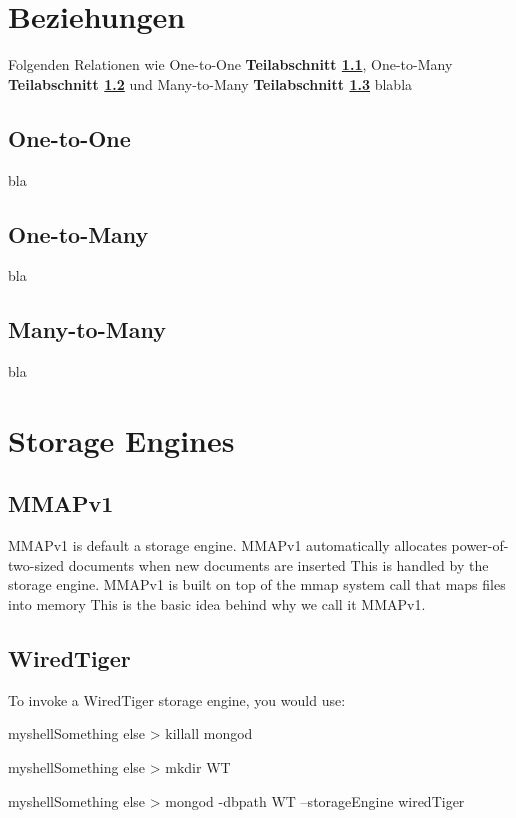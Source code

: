 \section{Beziehungen}
Folgenden Relationen wie One-to-One \textbf{Teilabschnitt \ref{1:1}}, One-to-Many \textbf{Teilabschnitt \ref{1:n}} und Many-to-Many \textbf{Teilabschnitt \ref{n:m}} blabla

\subsection{One-to-One}\label{1:1}
bla

\subsection{One-to-Many}\label{1:n}
bla

\subsection{Many-to-Many}\label{n:m}
bla

\section{Storage Engines}

\subsection{MMAPv1}
MMAPv1 is default a storage engine.
MMAPv1 automatically allocates power-of-two-sized documents when new documents are inserted
This is handled by the storage engine.
MMAPv1 is built on top of the mmap system call that maps files into memory
This is the basic idea behind why we call it MMAPv1.

\subsection{WiredTiger}
To invoke a WiredTiger storage engine, you would use:

\begin{listingsbox}[label={lst:X}]{myshell}{Something else}
> killall mongod
\end{listingsbox}
\begin{listingsbox}[label={lst:X}]{myshell}{Something else}
> mkdir WT
\end{listingsbox}

\begin{listingsbox}[label={lst:X}]{myshell}{Something else}
> mongod -dbpath WT --storageEngine wiredTiger
\end{listingsbox}

